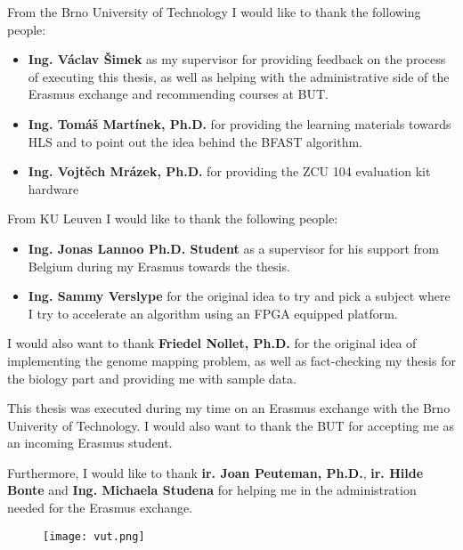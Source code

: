 From the Brno University of Technology I would like to thank the following people:
\begin{itemize}
	\item \textbf{Ing. V\'aclav \v Simek} as my supervisor for providing feedback on the process of executing this thesis, as well as helping with the administrative side of the Erasmus exchange and recommending courses at BUT.
	\item \textbf{Ing. Tom\'a\v s Mart\'inek, Ph.D.} for providing the learning materials towards HLS and to point out the idea behind the BFAST algorithm.
	\item \textbf{Ing. Vojt\v ech Mr\'azek, Ph.D.} for providing the ZCU 104 evaluation kit hardware
\end{itemize}

From KU Leuven I would like to thank the following people:
\begin{itemize}
	\item \textbf{Ing. Jonas Lannoo
		Ph.D. Student} as a supervisor for his support from Belgium during my Erasmus towards the thesis.
	\item \textbf{Ing. Sammy Verslype} for the original idea to try and pick a subject where I try to accelerate an algorithm using an FPGA equipped platform.
\end{itemize} 

I would also want to thank \textbf{Friedel Nollet, Ph.D.} for the original idea of implementing the genome mapping problem, as well as fact-checking my thesis for the biology part and providing me with sample data.

This thesis was executed during my time on an Erasmus exchange with the Brno Univerity of Technology. I would also want to thank the BUT for accepting me as an incoming Erasmus student.

Furthermore, I would like to thank \textbf{ir. Joan Peuteman, Ph.D.}, \textbf{ir. Hilde Bonte} and \textbf{Ing. Michaela Studena} for helping me in the administration needed for the Erasmus exchange.

\begin{figure}[H]
	\centering
	\texttt{[image: vut.png]}
\end{figure}